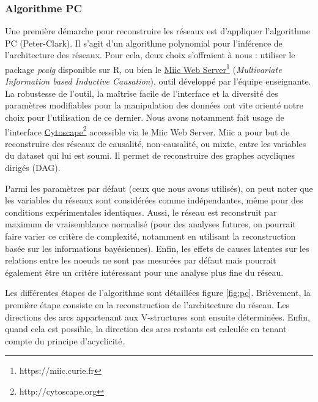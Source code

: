 \documentclass[fleqn,11pt]{SelfArx} %
\begin{document}
\subsubsection{Algorithme PC}
Une première démarche pour reconstruire les réseaux est d'appliquer l'algorithme PC\cite{pc} (Peter-Clark). Il s'agit d'un algorithme polynomial pour l'inférence de l'architecture des réseaux. Pour cela, deux choix s'offraient à nous : utiliser le package \textit{pcalg} disponible sur R, ou bien le \href{https://miic.curie.fr}{Miic Web Server}\footnote{https://miic.curie.fr} (\textit{Multivariate Information based Inductive Causation}), outil développé par l'équipe enseignante. La robustesse de l'outil, la maîtrise facile de l'interface et la diversité des paramètres modifiables pour la manipulation des données ont vite orienté notre choix pour l'utilisation de ce dernier. Nous avons notamment fait usage de l'interface \href{http://cytoscape.org}{Cytoscape}\footnote{http://cytoscape.org} accessible via le Miic Web Server. Miic a pour but de reconstruire des réseaux de causalité, non-causalité, ou mixte, entre les variables du dataset qui lui est soumi. Il permet de reconstruire des graphes acycliques dirigés (DAG). 

\par Parmi les paramètres par défaut (ceux que nous avons utilisés), on peut noter que les variables du réseaux sont considérées comme indépendantes, même pour des conditions expérimentales identiques. Aussi, le réseau est reconstruit par maximum de vraisemblance normalisé (pour des analyses futures, on pourrait faire varier ce critère de complexité, notamment en utilisant la reconstruction basée sur les informations bayésiennes). Enfin, les effets de causes latentes sur les relations entre les noeuds ne sont pas mesurées par défaut mais pourrait également être un critére intéressant pour une analyse plus fine du réseau. 

\par Les différentes étapes de l'algorithme sont détaillées figure \ref{fig:pc}. Brièvement, la première étape consiste en la reconstruction de l'architecture du réseau. Les directions des arcs appartenant aux V-structures sont ensuite déterminées. Enfin, quand cela est possible, la direction des arcs restants est calculée en tenant compte du principe d'acyclicité. 
\end{document}
